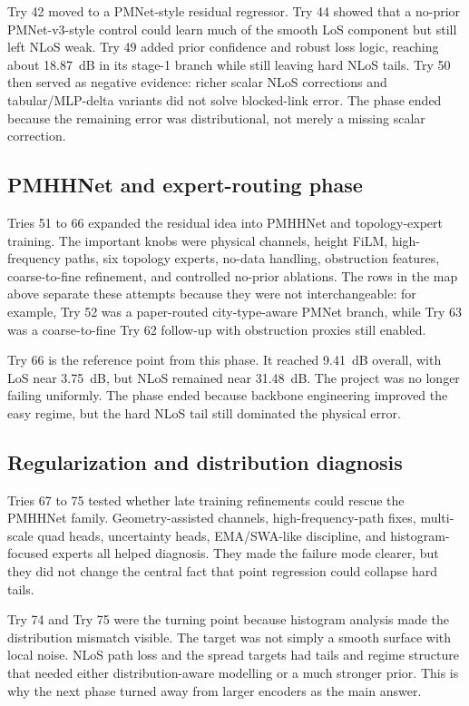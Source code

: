 Try 42 moved to a PMNet-style residual regressor. Try 44 showed that a
no-prior PMNet-v3-style control could learn much of the smooth LoS component
but still left NLoS weak. Try 49 added prior confidence and robust loss logic,
reaching about \SI{18.87}{dB} in its stage-1 branch while still leaving hard
NLoS tails. Try 50 then served as negative evidence: richer scalar NLoS
corrections and tabular/MLP-delta variants did not solve blocked-link error.
The phase ended because the remaining error was distributional, not merely a
missing scalar correction.

\subsection{PMHHNet and expert-routing phase}

Tries 51 to 66 expanded the residual idea into PMHHNet and topology-expert
training. The important knobs were physical channels, height FiLM, high-
frequency paths, six topology experts, no-data handling, obstruction features,
coarse-to-fine refinement, and controlled no-prior ablations. The rows in the
map above separate these attempts because they were not interchangeable: for
example, Try 52 was a paper-routed city-type-aware PMNet branch, while Try 63
was a coarse-to-fine Try 62 follow-up with obstruction proxies still enabled.

Try 66 is the reference point from this phase. It reached \SI{9.41}{dB}
overall, with LoS near \SI{3.75}{dB}, but NLoS remained near
\SI{31.48}{dB}. The project was no longer failing uniformly. The phase ended
because backbone engineering improved the easy regime, but the hard NLoS tail
still dominated the physical error.

\subsection{Regularization and distribution diagnosis}

Tries 67 to 75 tested whether late training refinements could rescue the
PMHHNet family. Geometry-assisted channels, high-frequency-path fixes,
multi-scale quad heads, uncertainty heads, EMA/SWA-like discipline, and
histogram-focused experts all helped diagnosis. They made the failure mode
clearer, but they did not change the central fact that point regression could
collapse hard tails.

Try 74 and Try 75 were the turning point because histogram analysis made the
distribution mismatch visible. The target was not simply a smooth surface with
local noise. NLoS path loss and the spread targets had tails and regime
structure that needed either distribution-aware modelling or a much stronger
prior. This is why the next phase turned away from larger encoders as the main
answer.

